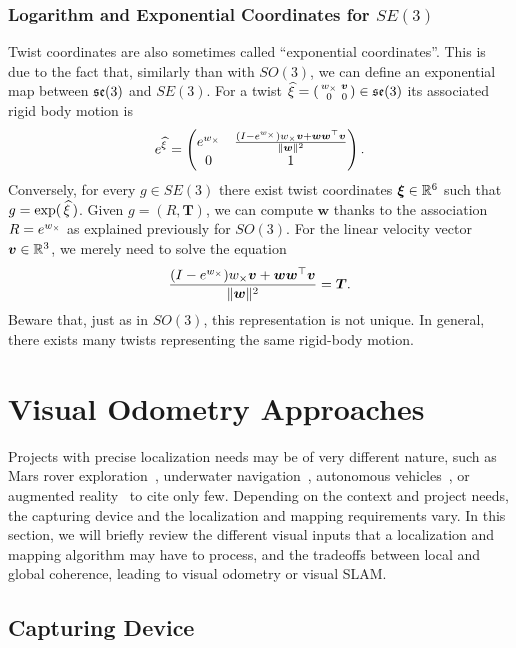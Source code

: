 \subsubsection{Logarithm and Exponential Coordinates for $SE(3)$}%
\label{ssub:exponential_coordinates_for_se_3}

Twist coordinates are also sometimes called ``exponential coordinates''.
This is due to the fact that, similarly than with $SO(3)$,
we can define an exponential map between $\mathfrak{se}(3)$ and $SE(3)$.
For a twist $\widehat{\xi} = \left(\begin{smallmatrix} {w}_{\times} & \bm{v} \\0 & 0 \end{smallmatrix} \right) \in \mathfrak{se}(3)$
its associated rigid body motion is
\[
	e^{\widehat{\xi}} =
	\begin{pmatrix}
		e^{{w}_{\times}}
			& \frac{(I-e^{{w}_{\times}}) {w}_{\times} \bm{v}
				+ \bm{w}\bm{w}^{\top}\bm{v}}{\|\bm{w}\|^2}
			\\
		0 & 1
	\end{pmatrix}.
\]
Conversely, for every $g \in SE(3)$ there exist
twist coordinates $\bm{\xi} \in \mathbb{R}^6$ such that $g=\exp(\,\widehat{\xi}\,)$.
Given $g = (R,\bm{T})$, we can compute $\bm{w}$ thanks to the association
$R = e^{{w}_{\times}}$ as explained previously for $SO(3)$.
For the linear velocity vector $\bm{v} \in \mathbb{R}^3$,
we merely need to solve the equation
\[
	\frac{(I-e^{{w}_{\times}}) {w}_{\times} \bm{v}
		+ \bm{w}\bm{w}^{\top}\bm{v}}{\|\bm{w}\|^2}
	= \bm{T}.
\]
Beware that, just as in $SO(3)$, this representation is not unique.
In general, there exists many twists representing the same rigid-body motion.


\section{Visual Odometry Approaches}%
\label{sec:visual-odometry-approaches}

Projects with precise localization needs may be of very different nature,
such as Mars rover exploration~\cite{maimone2007two},
underwater navigation~\cite{dunbabin2005hybrid},
autonomous vehicles~\cite{bertozzi2011viac},
or augmented reality~\cite{schops2014semi} to cite only few.
Depending on the context and project needs,
the capturing device and the localization and mapping requirements vary.
In this section, we will briefly review the different visual inputs
that a localization and mapping algorithm may have to process,
and the tradeoffs between local and global coherence,
leading to visual odometry or visual SLAM.\@

\subsection{Capturing Device}%
\label{sub:capturing-device}

